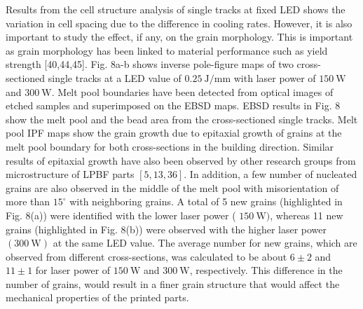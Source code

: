 \documentclass[10pt]{article}
\begin{document}
Results from the cell structure analysis of single tracks at fixed LED shows the variation in cell spacing due to the difference in cooling rates. However, it is also important to study the effect, if any, on the grain morphology. This is important as grain morphology has been linked to material performance such as yield strength [40,44,45]. Fig. 8a-b shows inverse pole-figure maps of two cross-sectioned single tracks at a LED value of $0.25 \mathrm{~J} / \mathrm{mm}$ with laser power of $150 \mathrm{~W}$ and $300 \mathrm{~W}$. Melt pool boundaries have been detected from optical images of etched samples and superimposed on the EBSD maps. EBSD results in Fig. 8 show the melt pool and the bead area from the cross-sectioned single tracks. Melt pool IPF maps show the grain growth due to epitaxial growth of grains at the melt pool boundary for both cross-sections in the building direction. Similar results of epitaxial growth have also been observed by other research groups from microstructure of LPBF parts $[5,13,36]$. In addition, a few number of nucleated grains are also observed in the middle of the melt pool with misorientation of more than $15^{\circ}$ with neighboring grains. A total of 5 new grains (highlighted in Fig. 8(a)) were identified with the lower laser power ( $150 \mathrm{~W})$, whereas 11 new grains (highlighted in Fig. 8(b)) were observed with the higher laser power $(300 \mathrm{~W})$ at the same LED value. The average number for new grains, which are observed from different cross-sections, was calculated to be about $6 \pm 2$ and $11 \pm 1$ for laser power of $150 \mathrm{~W}$ and $300 \mathrm{~W}$, respectively. This difference in the number of grains, would result in a finer grain structure that would affect the mechanical properties of the printed parts.
\end{document}

